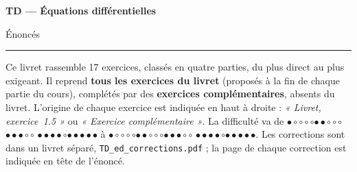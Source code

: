 \documentclass[a4paper,11pt]{article}
\numberwithin{equation}{section}
\numberwithin{figure}{section}
\numberwithin{table}{section}
\theoremstyle{enonce}
\theoremstyle{exemple}
\theoremstyle{remarque}
\newcommand{\niveau}[1]{{\color{Ocre}\footnotesize
  \ifcase#1\or$\bullet\circ\circ\circ\circ$\or$\bullet\bullet\circ\circ\circ$\or$\bullet\bullet\bullet\circ\circ$%
  \or$\bullet\bullet\bullet\bullet\circ$\or$\bullet\bullet\bullet\bullet\bullet$\fi}}
\begin{document}
\thispagestyle{plain}
{\sffamily\small\color{Gris}}\par\vspace{0.2em}
{\sffamily\bfseries\fontsize{26}{30}\selectfont\color{Ink}TD --- Équations différentielles}\par\vspace{0.3em}
{\sffamily\Large\color{BleuMoyen}Énoncés}\par\vspace{0.4em}
{\color{Ocre}\rule{3.2cm}{1.4pt}}\par\vspace{0.8em}
{\small Ce livret rassemble 17 exercices, classés en quatre parties, du plus direct au plus exigeant.
Il reprend \textbf{tous les exercices du livret} (proposés à la fin de chaque partie du cours), complétés par des
\textbf{exercices complémentaires}, absents du livret. L'origine de chaque exercice est indiquée en haut à droite :
\emph{« Livret, exercice~1.5 »} ou \emph{« Exercice complémentaire »}. La difficulté va de \niveau{1} à \niveau{5}.
Les corrections sont dans un livret séparé, \texttt{TD\_ed\_corrections.pdf} ; la page de chaque correction est indiquée en tête de l'énoncé.}
\end{document}
